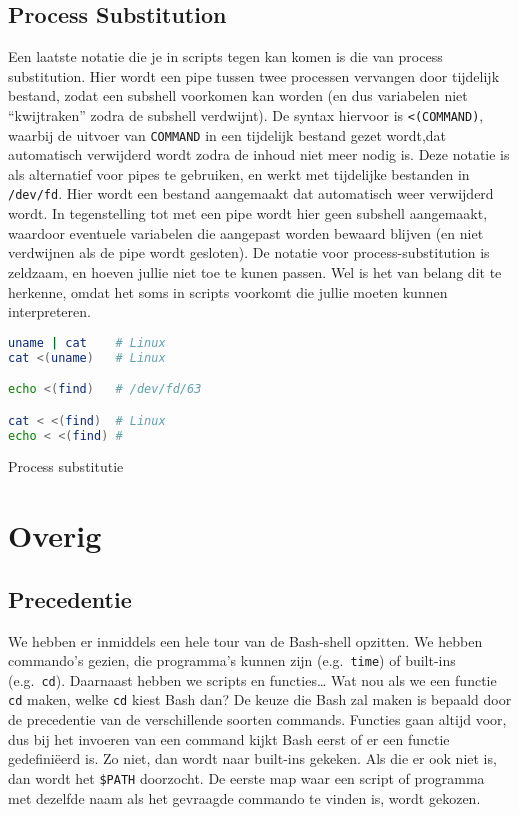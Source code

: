 \subsection{Process Substitution}\label{process-substitution}

Een laatste notatie die je in scripts tegen kan komen is die van process substitution. Hier wordt een pipe tussen twee processen vervangen door tijdelijk bestand, zodat een subshell voorkomen kan worden (en dus variabelen niet ``kwijtraken'' zodra de subshell verdwijnt). De syntax hiervoor is \texttt{\textless{}(COMMAND)}, waarbij de uitvoer van \texttt{COMMAND} in een tijdelijk bestand gezet wordt,dat automatisch verwijderd wordt zodra de inhoud niet meer nodig is. Deze notatie is als alternatief voor pipes te gebruiken, en werkt met tijdelijke bestanden in \texttt{/dev/fd}. Hier wordt een bestand aangemaakt dat automatisch weer verwijderd wordt. In tegenstelling tot met een pipe wordt hier geen subshell aangemaakt, waardoor eventuele variabelen die aangepast worden bewaard blijven (en niet verdwijnen als de pipe wordt gesloten). De notatie voor process-substitution is zeldzaam, en hoeven jullie niet toe te kunen passen. Wel is het van belang dit te herkenne, omdat het soms in scripts voorkomt die jullie moeten kunnen interpreteren.

\begin{listing}
\begin{lstlisting}[language=bash]
uname | cat    # Linux
cat <(uname)   # Linux

echo <(find)   # /dev/fd/63

cat < <(find)  # Linux
echo < <(find) # 
\end{lstlisting}
\caption{Process substitutie}
\end{listing}

\section{Overig}\label{troubleshooting}

\subsection{Precedentie}\label{precedentie}

We hebben er inmiddels een hele tour van de Bash-shell opzitten. We hebben commando's gezien, die programma's kunnen zijn (e.g.~\texttt{time}) of built-ins (e.g.~\texttt{cd}). Daarnaast hebben we scripts en functies\ldots{} Wat nou als we een functie \texttt{cd} maken, welke \texttt{cd} kiest Bash dan? De keuze die Bash zal maken is bepaald door de precedentie van de verschillende soorten commands. Functies gaan altijd voor, dus bij het invoeren van een command kijkt Bash eerst of er een functie gedefiniëerd is. Zo niet, dan wordt naar built-ins gekeken. Als die er ook niet is, dan wordt het \texttt{\$PATH} doorzocht. De eerste map waar een script of programma met dezelfde naam als het gevraagde commando te vinden is, wordt gekozen.

